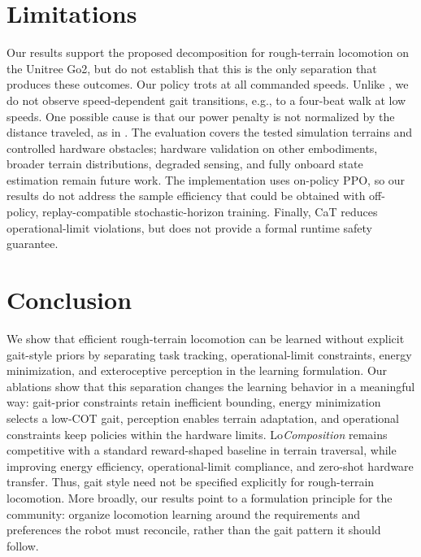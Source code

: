 \documentclass{article}
\begin{document}
    \section{Limitations}
    \label{sec:limitations}
    Our results support the proposed decomposition for rough-terrain locomotion on the Unitree Go2, but do not establish that this is the only separation that produces these outcomes.
    Our policy trots at all commanded speeds. Unlike \citet{fuMinimizingEnergyConsumption2022,liangAdaptiveEnergyRegularization2025a}, we do not observe speed-dependent gait transitions, e.g., to a four-beat walk at low speeds. One possible cause is that our power penalty is not normalized by the distance traveled, as in \citet{liangAdaptiveEnergyRegularization2025a}.
    The evaluation covers the tested simulation terrains and controlled hardware obstacles; hardware validation on other embodiments, broader terrain distributions, degraded sensing, and fully onboard state estimation remain future work. 
    The implementation uses on-policy PPO, so our results do not address the sample efficiency that could be obtained with off-policy, replay-compatible stochastic-horizon training.
    Finally, CaT reduces operational-limit violations, but does not provide a formal runtime safety guarantee.
    
    \section{Conclusion}
    \label{sec:conclusion}
    We show that efficient rough-terrain locomotion can be learned without explicit gait-style priors by separating task tracking, operational-limit constraints, energy minimization, and exteroceptive perception in the learning formulation. 
    Our ablations show that this separation changes the learning behavior in a meaningful way: gait-prior constraints retain inefficient bounding, energy minimization selects a low-COT gait, perception enables terrain adaptation, and operational constraints keep policies within the hardware limits.
    Lo\textit{Composition} remains competitive with a standard reward-shaped baseline in terrain traversal, while improving energy efficiency, operational-limit compliance, and zero-shot hardware transfer.
    Thus, gait style need not be specified explicitly for rough-terrain locomotion. 
    More broadly, our results point to a formulation principle for the community: organize locomotion learning around the requirements and preferences the robot must reconcile, rather than the gait pattern it should follow.
\end{document}
